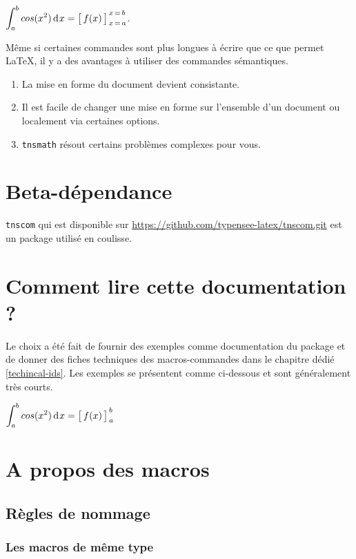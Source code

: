 \documentclass[12pt,a4paper]{book}
\theoremstyle{definition}
\begin{document}
{{\begin{latexex-alone}
$\dintegrate*{cos(x^2)}{x}{a}{b} = \hook{f(x)}{x}{a}{b}$.
\end{latexex-alone}


Même si certaines commandes sont plus longues à écrire que ce que permet \LaTeX{}, il y a des avantages à utiliser des commandes sémantiques.
\begin{enumerate}
	\item La mise en forme du document devient consistante.

	\item Il est facile de changer une mise en forme sur l'ensemble d'un document ou localement via certaines options.

	\item \verb+tnsmath+ résout certains problèmes \og complexes \fg{} pour vous.
\end{enumerate}




\section{Beta-dépendance}

\verb#tnscom# qui est disponible sur \url{https://github.com/typensee-latex/tnscom.git} est un package utilisé en coulisse.
\section{Comment lire cette documentation ?}

Le choix a été fait de fournir des exemples comme documentation du package et de donner des fiches techniques des macros-commandes dans le chapitre dédié \ref{techincal-ids}.
Les exemples se présentent comme ci-dessous et sont généralement très courts.

\begin{latexex}
$\dintegrate*{cos(x^2)}{x}{a}{b}
 =
 \hook*{f(x)}{x}{a}{b}$
\end{latexex}
\section{A propos des macros}

\subsection{Règles de nommage}

\subsubsection{Les macros de même \og type \fg}

}}
\end{document}

